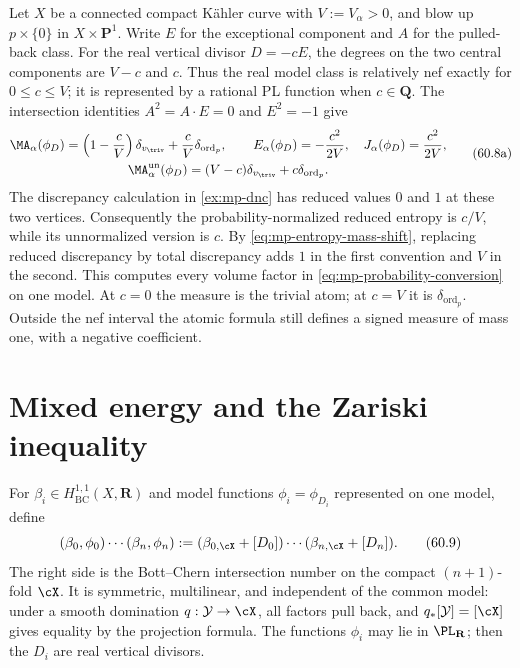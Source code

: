 \begin{example}\label{ex:mp-volume-conversion-curve}
Let $X$ be a connected compact K\"ahler curve with $V:=V_\alpha>0$,
and blow up $p\times\{0\}$ in $X\times\mathbf P^1$.
Write $E$ for the exceptional component and $A$ for the pulled-back
class. For the real vertical divisor $D=-cE$, the degrees on the two
central components are $V-c$ and $c$. Thus the real model class is
relatively nef exactly for $0\leq c\leq V$; it is represented by a
rational PL function when $c\in\mathbf Q$. The intersection identities
$A^2=A\cdot E=0$ and $E^2=-1$ give
\[
 \begin{gathered}
 \MA_\alpha(\phi_D)
     =\left(1-\frac cV\right)\delta_{v_{\triv}}
        +\frac cV\delta_{\operatorname{ord}_p},\qquad
 E_\alpha(\phi_D)=-\frac{c^2}{2V},\quad
 J_\alpha(\phi_D)=\frac{c^2}{2V},\\
 \MA_\alpha^{\mathrm{un}}(\phi_D)
     =(V-c)\delta_{v_{\triv}}+c\delta_{\operatorname{ord}_p}.
 \end{gathered}
\tag{60.8a}\label{eq:mp-curve-volume-conversion}
\]
The discrepancy calculation in \cref{ex:mp-dnc} has reduced values
$0$ and $1$ at these two vertices. Consequently the probability-normalized
reduced entropy is $c/V$, while its unnormalized version is $c$.
By \eqref{eq:mp-entropy-mass-shift}, replacing reduced discrepancy by
total discrepancy adds $1$ in the first convention and $V$ in the
second. This computes every volume factor in
\eqref{eq:mp-probability-conversion} on one model.
At $c=0$ the measure is the trivial atom; at $c=V$ it is
$\delta_{\operatorname{ord}_p}$. Outside the nef interval the atomic
formula still defines a signed measure of mass one, with a negative
coefficient.
\end{example}

\section{Mixed energy and the Zariski inequality}
\label{sec:mp-psh-mixed-energy}

For $\beta_i\in H^{1,1}_{\mathrm{BC}}(X,\mathbf R)$ and model functions
$\phi_i=\phi_{D_i}$ represented on one model, define
\[
 (\beta_0,\phi_0)\cdots(\beta_n,\phi_n)
 :=(\beta_{0,\cX}+[D_0])\cdots(\beta_{n,\cX}+[D_n]).
\tag{60.9}\label{eq:mp-mixed-pairing}
\]
The right side is the Bott--Chern intersection number on the compact
$(n+1)$-fold $\cX$.  It is symmetric, multilinear, and independent of
the common model: under a smooth domination $q:\mathcal Y\to\cX$, all factors pull back, and $q_*[\mathcal Y]=[\cX]$ gives equality by the projection formula. The functions $\phi_i$ may lie in $\PL_{\mathbf R}$; then the $D_i$ are real vertical divisors.

